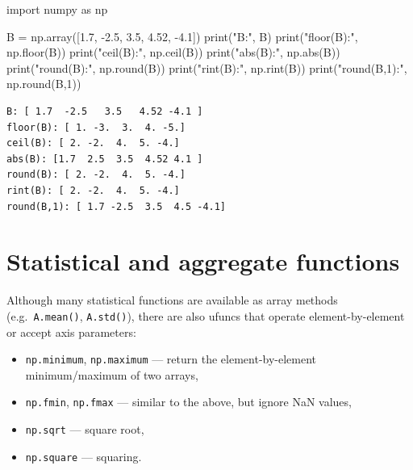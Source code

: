 \documentclass[
  english,
  letterpaper,
  DIV=11,
  numbers=noendperiod]{scrreprt}
\newenvironment{Shaded}{\begin{snugshade}}{\end{snugshade}}
\newcommand{\BuiltInTok}[1]{\textcolor[rgb]{0.00,0.23,0.31}{#1}}
\newcommand{\DecValTok}[1]{\textcolor[rgb]{0.68,0.00,0.00}{#1}}
\newcommand{\FloatTok}[1]{\textcolor[rgb]{0.68,0.00,0.00}{#1}}
\newcommand{\ImportTok}[1]{\textcolor[rgb]{0.00,0.46,0.62}{#1}}
\newcommand{\NormalTok}[1]{\textcolor[rgb]{0.00,0.23,0.31}{#1}}
\newcommand{\OperatorTok}[1]{\textcolor[rgb]{0.37,0.37,0.37}{#1}}
\newcommand{\StringTok}[1]{\textcolor[rgb]{0.13,0.47,0.30}{#1}}
\providecommand{\tightlist}{%
  \setlength{\itemsep}{0pt}\setlength{\parskip}{0pt}}
\begin{document}
\begin{Shaded}
\begin{Highlighting}[]
\ImportTok{import}\NormalTok{ numpy }\ImportTok{as}\NormalTok{ np}

\NormalTok{B }\OperatorTok{=}\NormalTok{ np.array([}\FloatTok{1.7}\NormalTok{, }\OperatorTok{{-}}\FloatTok{2.5}\NormalTok{, }\FloatTok{3.5}\NormalTok{, }\FloatTok{4.52}\NormalTok{, }\OperatorTok{{-}}\FloatTok{4.1}\NormalTok{])}
\BuiltInTok{print}\NormalTok{(}\StringTok{"B:"}\NormalTok{, B)}
\BuiltInTok{print}\NormalTok{(}\StringTok{"floor(B):"}\NormalTok{, np.floor(B))}
\BuiltInTok{print}\NormalTok{(}\StringTok{"ceil(B):"}\NormalTok{, np.ceil(B))}
\BuiltInTok{print}\NormalTok{(}\StringTok{"abs(B):"}\NormalTok{, np.}\BuiltInTok{abs}\NormalTok{(B))}
\BuiltInTok{print}\NormalTok{(}\StringTok{"round(B):"}\NormalTok{, np.}\BuiltInTok{round}\NormalTok{(B))}
\BuiltInTok{print}\NormalTok{(}\StringTok{"rint(B):"}\NormalTok{, np.rint(B))}
\BuiltInTok{print}\NormalTok{(}\StringTok{"round(B,1):"}\NormalTok{, np.}\BuiltInTok{round}\NormalTok{(B,}\DecValTok{1}\NormalTok{))}
\end{Highlighting}
\end{Shaded}

\begin{verbatim}
B: [ 1.7  -2.5   3.5   4.52 -4.1 ]
floor(B): [ 1. -3.  3.  4. -5.]
ceil(B): [ 2. -2.  4.  5. -4.]
abs(B): [1.7  2.5  3.5  4.52 4.1 ]
round(B): [ 2. -2.  4.  5. -4.]
rint(B): [ 2. -2.  4.  5. -4.]
round(B,1): [ 1.7 -2.5  3.5  4.5 -4.1]
\end{verbatim}

\section{Statistical and aggregate
functions}\label{statistical-and-aggregate-functions}

Although many statistical functions are available as array methods
(e.g.~\texttt{A.mean()}, \texttt{A.std()}), there are also ufuncs that
operate element-by-element or accept axis parameters:

\begin{itemize}
\tightlist
\item
  \texttt{np.minimum}, \texttt{np.maximum} --- return the
  element-by-element minimum/maximum of two arrays,
\item
  \texttt{np.fmin}, \texttt{np.fmax} --- similar to the above, but
  ignore NaN values,
\item
  \texttt{np.sqrt} --- square root,
\item
  \texttt{np.square} --- squaring.
\end{itemize}
\end{document}
